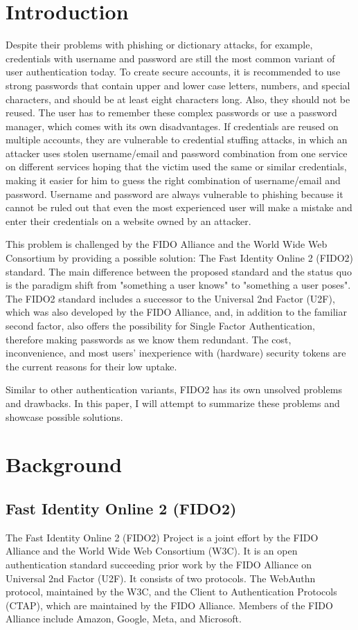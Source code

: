 \documentclass[runningheads]{llncs}
\begin{document}
\section{Introduction}
Despite their problems with phishing or dictionary attacks, for example, credentials with username and password are still the most common variant of user authentication today. To create secure accounts, it is recommended to use strong passwords that contain upper and lower case letters, numbers, and special characters, and should be at least eight characters long. Also, they should not be reused. The user has to remember these complex passwords or use a password manager, which comes with its own disadvantages. If credentials are reused on multiple accounts, they are vulnerable to credential stuffing attacks, in which an attacker uses stolen username/email and password combination from one service on different services hoping that the victim used the same or similar credentials, making it easier for him to guess the right combination of username/email and password. Username and password are always vulnerable to phishing because it cannot be ruled out that even the most experienced user will make a mistake and enter their credentials on a website owned by an attacker.

This problem is challenged by the FIDO Alliance and the World Wide Web Consortium by providing a possible solution: The Fast Identity Online 2 (FIDO2) standard. The main difference between the proposed standard and the status quo is the paradigm shift from "something a user knows" to "something a user poses". The FIDO2 standard includes a successor to the Universal 2nd Factor (U2F), which was also developed by the FIDO Alliance, and, in addition to the familiar second factor, also offers the possibility for Single Factor Authentication, therefore making passwords as we know them redundant. The cost, inconvenience, and most users' inexperience with (hardware) security tokens are the current reasons for their low uptake.\cite{274547}\cite{9152694}

Similar to other authentication variants, FIDO2 has its own unsolved problems and drawbacks. In this paper, I will attempt to summarize these problems and showcase possible solutions. 

\section{Background}
\subsection{Fast Identity Online 2 (FIDO2)}
The Fast Identity Online 2 (FIDO2) Project is a joint effort by the FIDO Alliance and the World Wide Web Consortium (W3C). It is an open authentication standard succeeding prior work by the FIDO Alliance on Universal 2nd Factor (U2F). \cite{9152694}  It consists of two protocols. The WebAuthn protocol, maintained by the W3C, and the Client to Authentication Protocols (CTAP), which are maintained by the FIDO Alliance. Members of the FIDO Alliance include Amazon, Google, Meta, and Microsoft.
\end{document}
